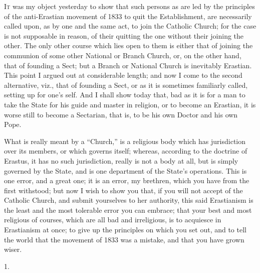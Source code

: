 I\textsc{t} was my object yesterday to show that such persons as are led by
the principles of the anti-Erastian movement of 1833 to quit the
Establishment, are necessarily called upon, as by one and the same
act, to join the Catholic Church; for the case is not supposable in
reason, of their quitting the one without their joining the other. The
only other course which lies open to them is either that of joining
the communion of some other National or Branch Church, or, on the
other hand, that of founding a Sect; but a Branch or National Church
is inevitably Erastian. This point I argued out at considerable
length; and now I come to the second alternative, viz., that of
founding a Sect, or as it is sometimes familiarly called, setting up
for one's self. And I shall show today that, bad as it is for a man to
take the State for his guide and master in religion, or to become an
Erastian, it is worse still to become a Sectarian, that is, to be his
own Doctor and his own Pope.

What is really meant by a ``Church,'' is a religious body
which has jurisdiction over its members, or which governs itself;
whereas, according to the doctrine of Erastus, it has no such
jurisdiction, really is not a body at all, but is simply governed by
the State, and is one department of the State's operations. This is
one error, and a great one; it is an error, my brethren, which you
have from the first withstood; but now I wish to show you that, if you
will not accept of the Catholic Church, and submit yourselves to her
authority, this said Erastianism is the least and the most tolerable
error you can embrace; that your best and most religious of courses,
which are all bad and irreligious, is to acquiesce in Erastianism at
once; to give up the principles on which you set out, and to tell the
world that the movement of 1833 was a mistake, and that you have grown
wiser.

1.

